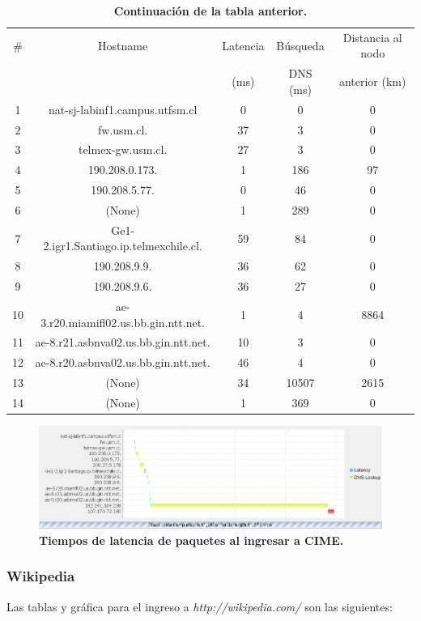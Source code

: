 \documentclass[12pt]{article}
\begin{document}
\begin{table}[H]
\centering
\begin{tabular}{| c | c | c | c | c |}
\hline
\# & Hostname & Latencia & Búsqueda & Distancia al nodo\\
 &  & (ms) & DNS (ms) & anterior (km)\\
\hline
1 & nat-sj-labinf1.campus.utfsm.cl & 0 & 0 & 0\\
\hline
2 & fw.usm.cl. & 37 & 3 & 0\\
\hline
3 & telmex-gw.usm.cl. & 27 & 3 & 0\\
\hline
4 & 190.208.0.173. & 1 & 186 & 97\\
\hline
5 & 190.208.5.77. & 0 & 46 & 0\\
\hline
6 & (None) & 1 & 289 & 0\\
\hline
7 & Ge1-2.igr1.Santiago.ip.telmexchile.cl. & 59 & 84 & 0\\
\hline
8 & 190.208.9.9. & 36 & 62 & 0\\
\hline
9 & 190.208.9.6. & 36 & 27 & 0\\
\hline
10 & ae-3.r20.miamifl02.us.bb.gin.ntt.net. & 1 & 4 & 8864\\
\hline
11 & ae-8.r21.asbnva02.us.bb.gin.ntt.net. & 10 & 3 & 0\\
\hline
12 & ae-8.r20.asbnva02.us.bb.gin.ntt.net. & 46 & 4 & 0\\
\hline
13 & (None) & 34 & 10507 & 2615\\
\hline
14 & (None) & 1 & 369 & 0\\
\hline
\end{tabular}
\caption{\small \textbf{Continuación de la tabla anterior.}}
\end{table}

\begin{figure}[H] 
\centering 
\includegraphics[width=1\textwidth]{imagenes/cime_grafica.png} \caption{\small \textbf{Tiempos de latencia de paquetes al ingresar a CIME.}}
\label{fig:diagrama_3} 
\end{figure}

\subsubsection{Wikipedia}
Las tablas y gráfica para el ingreso a \emph{http://wikipedia.com/} son las siguientes:\\
\end{document}
